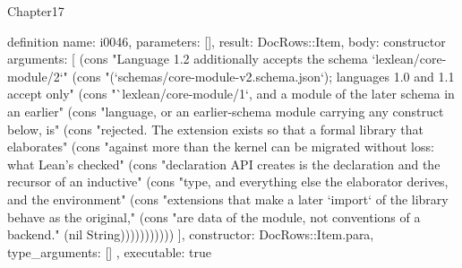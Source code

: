 \begin{lexlean}{Chapter17}
\begin{semanticmodule}
definition{
  name: i0046,
  parameters: [],
  result: DocRows::Item,
  body: constructor{
    arguments: [
      (cons "Language 1.2 additionally accepts the schema `lexlean/core-module/2`" (cons "(`schemas/core-module-v2.schema.json`); languages 1.0 and 1.1 accept only" (cons "`lexlean/core-module/1`, and a module of the later schema in an earlier" (cons "language, or an earlier-schema module carrying any construct below, is" (cons "rejected. The extension exists so that a formal library that elaborates" (cons "against more than the kernel can be migrated without loss: what Lean's checked" (cons "declaration API creates is the declaration and the recursor of an inductive" (cons "type, and everything else the elaborator derives, and the environment" (cons "extensions that make a later `import` of the library behave as the original," (cons "are data of the module, not conventions of a backend." (nil String)))))))))))
    ],
    constructor: DocRows::Item.para,
    type_arguments: []
  },
  executable: true
}


\end{semanticmodule}
\end{lexlean}
